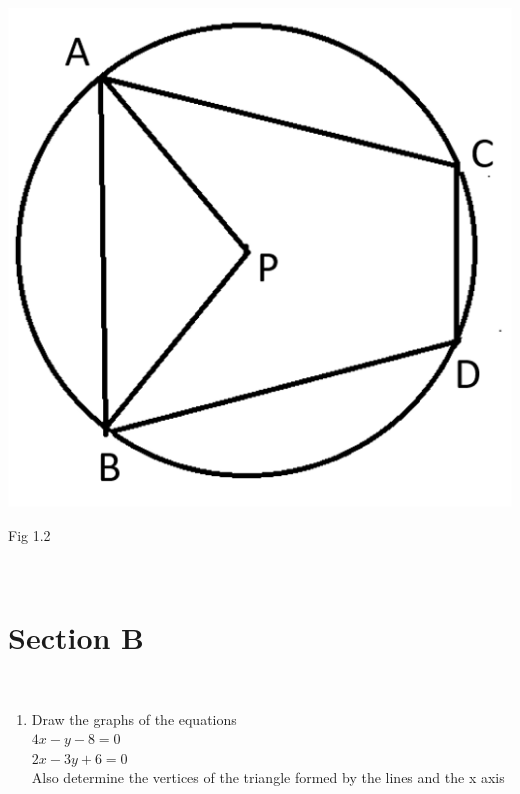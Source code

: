 \documentclass[journal,12pt,twocolumn]{IEEEtran}
\begin{document}
\begin{enumerate}[label=1.\arabic*]
\includegraphics[scale = 0.4]{fig 1.2}\\
\begin{flushright}
Fig 1.2\\
\end{flushright}
\vspace{1mm}\\
\section{Section B}
\vspace{3mm}\\
\begin{enumerate}[label=2.\arabic*]
\item Draw the graphs of the equations\\
$ 4x - y - 8 = 0 $\\
$ 2x - 3y + 6 = 0 $\\
Also determine the vertices of the triangle formed by the lines and the
x axis\\


\end{enumerate}
\end{enumerate}
\end{document}
